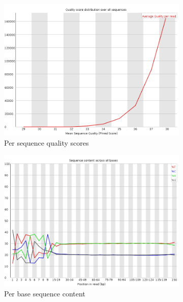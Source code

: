 \documentclass{article}
\begin{document}
\begin{figure}[htbp]
\begin{subfigure}{0.45\linewidth}
\includegraphics[width=\linewidth]{04-R1.qfilter_fastqc/Images/per_sequence_quality.png}
\caption{Per sequence quality scores}
\end{subfigure}
\begin{subfigure}{0.45\linewidth}
\includegraphics[width=\linewidth]{04-R1.qfilter_fastqc/Images/per_base_sequence_content.png}
\caption{Per base sequence content}
\end{subfigure}
\begin{subfigure}{0.45\linewidth}

\end{subfigure}
\end{figure}
\end{document}
